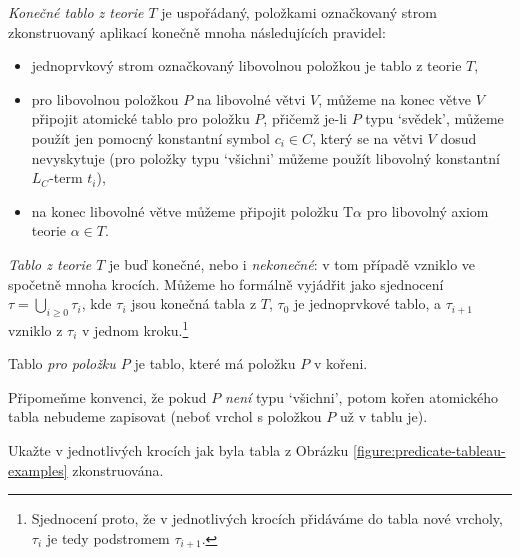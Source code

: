 \begin{definition}[Tablo]
    \emph{Konečné tablo z teorie $T$} je uspořádaný, položkami označkovaný strom zkonstruovaný aplikací konečně mnoha následujících pravidel:
    \begin{itemize}
        \item jednoprvkový strom označkovaný libovolnou položkou je tablo z teorie $T$,
        \item pro libovolnou položkou $P$ na libovolné větvi $V$, můžeme na konec větve $V$ připojit atomické tablo pro položku $P$, přičemž je-li $P$ typu `svědek', můžeme použít jen pomocný konstantní symbol $c_i\in C$, který se na větvi $V$ dosud nevyskytuje (pro položky typu `všichni' můžeme použít libovolný konstantní $L_C$-term $t_i$),
        \item na konec libovolné větve můžeme připojit položku $\mathrm{T}\alpha$ pro libovolný axiom teorie $\alpha\in T$.
    \end{itemize}
    \emph{Tablo z teorie $T$} je buď konečné, nebo i \emph{nekonečné}: v tom případě vzniklo ve spočetně mnoha krocích. Můžeme ho formálně vyjádřit jako sjednocení $\tau=\bigcup_{i\geq 0}\tau_i$, kde $\tau_i$ jsou konečná tabla z $T$, $\tau_0$ je jednoprvkové tablo, a $\tau_{i+1}$ vzniklo z $\tau_i$ v jednom kroku.\footnote{Sjednocení proto, že v jednotlivých krocích přidáváme do tabla nové vrcholy, $\tau_i$ je tedy podstromem $\tau_{i+1}$.}
    
    Tablo \emph{pro položku $P$} je tablo, které má položku $P$ v kořeni.
    \end{definition}
    
    Připomeňme konvenci, že pokud $P$ \emph{není} typu `všichni', potom kořen atomického tabla nebudeme zapisovat (neboť vrchol s položkou $P$ už v tablu je).

\begin{exercise}
    Ukažte v jednotlivých krocích jak byla tabla z Obrázku \ref{figure:predicate-tableau-examples} zkonstruována.
\end{exercise}


